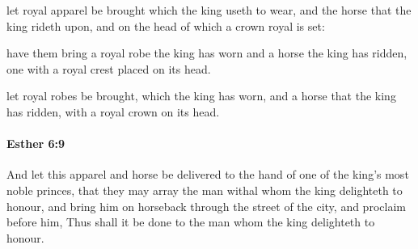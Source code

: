 			\begin{versebox}
					\item[BHS] 
					\item[LXX] 
					\item[ASV] let royal apparel be brought which the king useth to wear, and the horse that the king rideth upon, and on the head of which a crown royal is set:
					\item[NIV] have them bring a royal robe the king has worn and a horse the king has ridden, one with a royal crest placed on its head.
					\item[NRSV] let royal robes be brought, which the king has worn, and a horse that the king has ridden, with a royal crown on its head.
			\end{versebox}

		\paragraph{Esther 6:9} %
			\label{ESTHER-6-9}

			And let this apparel and horse be delivered to the hand of one of the king’s most noble princes, that they may array the man withal whom the king delighteth to honour, and bring him on horseback through the street of the city, and proclaim before him, Thus shall it be done to the man whom the king delighteth to honour.

